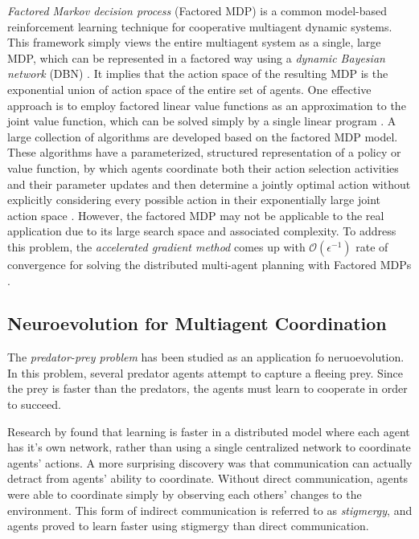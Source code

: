 \documentclass[conference]{IEEEtran}
\begin{document}
\textit{Factored Markov decision process} (Factored MDP) is a common model-based
reinforcement learning technique for cooperative multiagent dynamic systems.
This framework simply views the entire multiagent system as a single, large
MDP, which can be represented in a factored way using a \textit{dynamic Bayesian
    network} (DBN) \cite{guestrin2001multiagent}. 
It implies that the action space of the resulting MDP is the exponential union
of action space of the entire set of agents. 
One effective approach is to employ factored linear value functions as an
approximation to the joint value function, which can be solved simply by a
single linear program \cite{guestrin2001multiagent}. 
A large collection of algorithms are developed based on the factored MDP model. 
These algorithms have a parameterized, structured representation of a policy
or value function, by which agents coordinate both their action selection
activities and their parameter updates and then determine a jointly optimal
action without explicitly considering every possible action in their
exponentially large joint action space \cite{guestrin2002coordinated}. 
However, the factored MDP may not be applicable to the real application due to
its large search space and associated complexity.
To address this problem, the \textit{accelerated gradient method} comes up with
$\mathcal{O}(\epsilon^{-1})$ rate of convergence for solving the distributed
multi-agent planning with Factored MDPs \cite{suegeo2011accgrad}.

\subsection{Neuroevolution for Multiagent Coordination}

The \textit{predator-prey problem} has been studied as an application fo neruoevolution. In this problem, several predator agents attempt to capture a fleeing prey. Since the prey is faster than the predators, the agents must learn to cooperate in order to succeed.

Research by \cite{yong2001cooperative} found that learning is faster in a distributed model where each agent has it's own network, rather than using a single centralized network to coordinate agents' actions.
A more surprising discovery was that communication can actually detract from agents' ability to coordinate. 
Without direct communication, agents were able to coordinate simply by observing each others' changes to the environment. This form of indirect communication is referred to as \textit{stigmergy}, and agents proved to learn faster using stigmergy than direct communication. 
\end{document}
